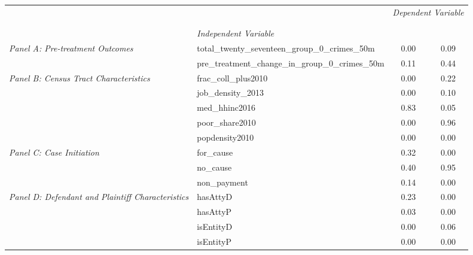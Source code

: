 \begin{tabular}{llcc}
\toprule
 &  & \multicolumn{2}{c}{\textit{Dependent Variable}} \\
\cline{3-4}
\\
 &  &  &  \\
 & \emph{Independent Variable} &  &  \\
\midrule
\multirow[c]{2}{3cm}{\textit{Panel A: Pre-treatment Outcomes}} & total_twenty_seventeen_group_0_crimes_50m & 0.00 & 0.09 \\
 & pre_treatment_change_in_group_0_crimes_50m & 0.11 & 0.44 \\
\cline{1-4}
\multirow[c]{5}{3cm}{\textit{Panel B: Census Tract Characteristics}} & frac_coll_plus2010 & 0.00 & 0.22 \\
 & job_density_2013 & 0.00 & 0.10 \\
 & med_hhinc2016 & 0.83 & 0.05 \\
 & poor_share2010 & 0.00 & 0.96 \\
 & popdensity2010 & 0.00 & 0.00 \\
\cline{1-4}
\multirow[c]{3}{3cm}{\textit{Panel C: Case Initiation}} & for_cause & 0.32 & 0.00 \\
 & no_cause & 0.40 & 0.95 \\
 & non_payment & 0.14 & 0.00 \\
\cline{1-4}
\multirow[c]{4}{3cm}{\textit{Panel D: Defendant and Plaintiff Characteristics}} & hasAttyD & 0.23 & 0.00 \\
 & hasAttyP & 0.03 & 0.00 \\
 & isEntityD & 0.00 & 0.06 \\
 & isEntityP & 0.00 & 0.00 \\
\cline{1-4}
\bottomrule
\end{tabular}
